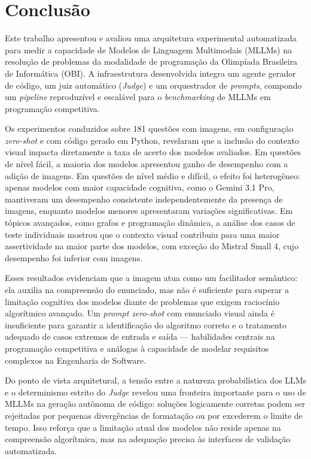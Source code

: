 \documentclass[sigconf,anonymous]{acmart} %
\begin{document}
\section{Conclusão}
\label{sec:conclusao}

Este trabalho apresentou e avaliou uma arquitetura experimental automatizada para medir a capacidade de Modelos de Linguagem Multimodais (MLLMs) na resolução de problemas da modalidade de programação da Olimpíada Brasileira de Informática (OBI). A infraestrutura desenvolvida integra um agente gerador de código, um juiz automático (\textit{Judge}) e um orquestrador de \textit{prompts}, compondo um \textit{pipeline} reproduzível e escalável para o \textit{benchmarking} de MLLMs em programação competitiva.

Os experimentos conduzidos sobre 181 questões com imagens, em configuração \textit{zero-shot} e com código gerado em Python, revelaram que a inclusão do contexto visual impacta diretamente a taxa de acerto dos modelos avaliados. Em questões de nível fácil, a maioria dos modelos apresentou ganho de desempenho com a adição de imagens. Em questões de nível médio e difícil, o efeito foi heterogêneo: apenas modelos com maior capacidade cognitiva, como o Gemini 3.1 Pro, mantiveram um desempenho consistente independentemente da presença de imagens, enquanto modelos menores apresentaram variações significativas. Em tópicos avançados, como grafos e programação dinâmica, a análise dos casos de teste individuais mostrou que o contexto visual contribuiu para uma maior assertividade na maior parte dos modelos, com exceção do Mistral Small 4, cujo desempenho foi inferior com imagens.

Esses resultados evidenciam que a imagem atua como um facilitador semântico: ela auxilia na compreensão do enunciado, mas não é suficiente para superar a limitação cognitiva dos modelos diante de problemas que exigem raciocínio algorítmico avançado. Um \textit{prompt zero-shot} com enunciado visual ainda é insuficiente para garantir a identificação do algoritmo correto e o tratamento adequado de casos extremos de entrada e saída --- habilidades centrais na programação competitiva e análogas à capacidade de modelar requisitos complexos na Engenharia de Software.

Do ponto de vista arquitetural, a tensão entre a natureza probabilística dos LLMs e o determinismo estrito do \textit{Judge} revelou uma fronteira importante para o uso de MLLMs na geração autônoma de código: soluções logicamente corretas podem ser rejeitadas por pequenas divergências de formatação ou por excederem o limite de tempo. Isso reforça que a limitação atual dos modelos não reside apenas na compreensão algorítmica, mas na adequação precisa às interfaces de validação automatizada.
\end{document}
